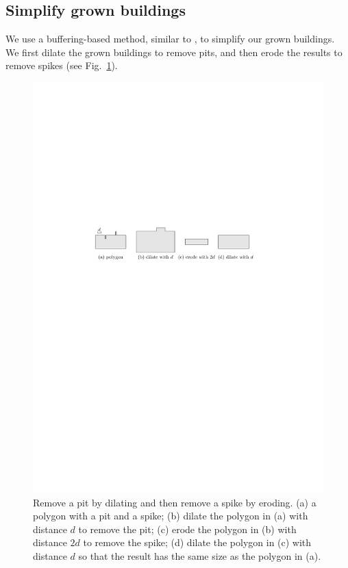 \documentclass[graybox]{svmult}
\newcommand{\fig}{Fig.~}
\begin{document}
\subsection{Simplify grown buildings}
\label{sec:Simplify}
We use a buffering-based method, 
similar to \textcite{Damen2008,Meijers2016}, 
to simplify our grown buildings. 
We first dilate the grown buildings to remove 
pits, and then erode the results to remove spikes
(see \fig\ref{fig:RemovePitAndSpike}).

\begin{figure}[tb]
	\centering
	\includegraphics[draft=false]{RemovePitAndSpike}
	\caption{Remove a pit by dilating and then remove a spike by eroding.
		(a) a polygon with a pit and a spike;
		(b) dilate the polygon in (a) with distance $d$ to remove the pit;
		(c) erode the polygon in (b) with distance $2d$ to remove the spike;
		(d) dilate the polygon in (c) with distance $d$ so that the result has 
		the same size as the polygon in (a).
	}
	\label{fig:RemovePitAndSpike}
\end{figure}
\end{document}
